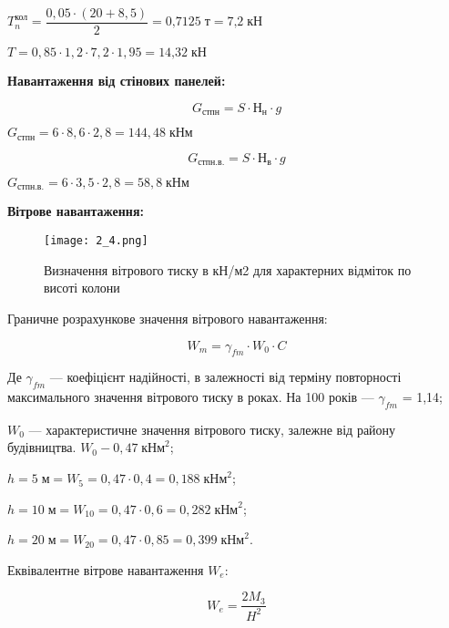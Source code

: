 \documentclass[a4paper,14pt]{article}
\begin{document}
$T^\textit{кол}_{n}=\dfrac {0,05\cdot (20+8,5)}{2}=\textit{0,7125}\;\textit{т}=\textit{7,2}\;\textit{кН}$

$T=0,85\cdot 1,2 \cdot 7,2 \cdot 1,95 = \textit{14,32}\;\textit{кН}$

\textbf{Навантаження від стінових панелей:}

\begin{equation}
    G_\textit{стпн}= S \cdot Н_\textit{н}\cdot g
\end{equation}

$G_\textit{стпн}= 6 \cdot 8,6\cdot 2,8 = 144,48\;\textit{кНм}$

\begin{equation}
    G_\textit{стпн.в.}= S \cdot Н_\textit{в}\cdot g
\end{equation}

$G_\textit{стпн.в.}= 6 \cdot 3,5\cdot 2,8= 58,8\;\textit{кНм}$

\textbf{Вітрове навантаження:}

\begin{figure}[h!]
    \begin{center}
        \texttt{[image: 2\_4.png]}
        \caption{Визначення вітрового тиску в кН/м2  для характерних відміток  по висоті колони }\label{ris2_4} 
    \end{center}
\end{figure}
Граничне розрахункове значення вітрового навантаження:

\begin{equation}
    W_\textit{m}= \gamma_{fm} \cdot W_\textit{0}\cdot C
\end{equation}

Де $\gamma_{fm}$ ---  коефіцієнт надійності, в залежності від терміну повторності максимального значення вітрового тиску в роках. На 100 років --- $\gamma_{fm}$ = 1,14;

$W_\textit{0}$ --- характеристичне значення вітрового тиску, залежне від району будівництва. $W_\textit{0} - 0,47\;\textit{кНм}^2$;

$h=5\;\textit{м} = W_{5}= 0,47\cdot 0,4 = 0,188\;\textit{кНм}^2$;

$h=10\;\textit{м} = W_{10}= 0,47\cdot 0,6 = 0,282\;\textit{кНм}^2$;

$h=20\;\textit{м} = W_{20}= 0,47\cdot 0,85 = 0,399\;\textit{кНм}^2$.

Еквівалентне вітрове навантаження $W_e$:

\begin{equation}
    W_\textit{e}= \dfrac{2M_3}{H^2}
\end{equation}
\end{document}
